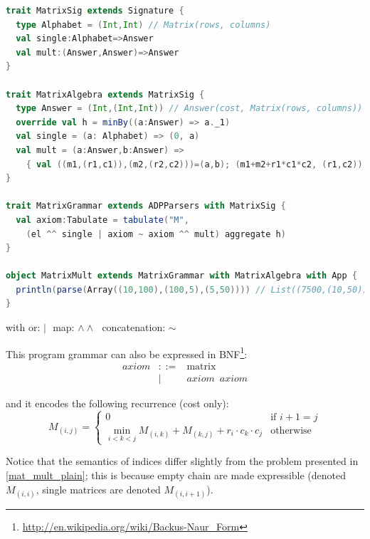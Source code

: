\newpage
\begin{lstlisting}[language=Scala, caption=Matrix chain mulitiplication DSL implementation]
trait MatrixSig extends Signature {
  type Alphabet = (Int,Int) // Matrix(rows, columns)
  val single:Alphabet=>Answer
  val mult:(Answer,Answer)=>Answer
}

trait MatrixAlgebra extends MatrixSig {
  type Answer = (Int,(Int,Int)) // Answer(cost, Matrix(rows, columns))
  override val h = minBy((a:Answer) => a._1)
  val single = (a: Alphabet) => (0, a)
  val mult = (a:Answer,b:Answer) =>
    { val ((m1,(r1,c1)),(m2,(r2,c2)))=(a,b); (m1+m2+r1*c1*c2, (r1,c2)) }
}

trait MatrixGrammar extends ADPParsers with MatrixSig {
  val axiom:Tabulate = tabulate("M",
    (el ^^ single | axiom ~ axiom ^^ mult) aggregate h)
}

object MatrixMult extends MatrixGrammar with MatrixAlgebra with App {
  println(parse(Array((10,100),(100,5),(5,50)))) // List((7500,(10,50)))
}
\end{lstlisting}
\begin{center}\vspace{-18pt} with or: $|\,\,$ map: $\land\land\,\,$ concatenation: $\sim$ \end{center}

This program grammar can also be expressed in BNF\footnote{\url{http://en.wikipedia.org/wiki/Backus-Naur\_Form}}:
\[\begin{array}{lrl}
axiom &::=& \text{matrix} \\
 &|& axiom \,\,\, axiom
\end{array}\]

and it encodes the following recurrence (cost only):
	\[M_{(i,j)}=\left\{\begin{array}{ll}
		0 & \text{if } i+1= j\\
		\min_{i<k<j} M_{(i,k)}+M_{(k,j)}+r_i \cdot c_k \cdot c_j & \text{otherwise}
	\end{array}\right. \]

Notice that the semantics of indices differ slightly from the problem presented in \ref{mat_mult_plain}; this is because empty chain are made expressible (denoted $M_{(i,i)}$, single matrices are denoted $M_{(i,i+1)}$).


